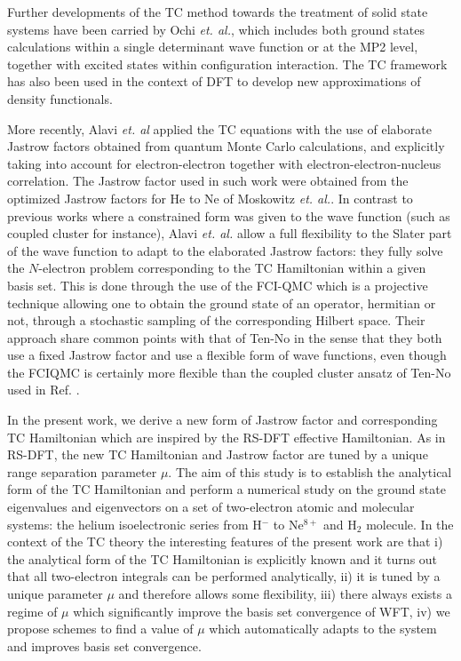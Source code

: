 \documentclass[aip,jcp,reprint,noshowkeys,superscriptaddress]{revtex4-1}
\begin{document}
Further developments of the TC method towards the treatment of solid state systems have been carried by Ochi \textit{et. al.}\cite{OchSodSakTsu-JCP-12,OchTsu-JCTC-14,OchTsu-CPL-15,OchYamAriTsu-JCP-16}, which includes both ground states calculations within a single determinant wave function \cite{OchSodSakTsu-JCP-12,OchYamAriTsu-JCP-16} or at the MP2 level\cite{OchTsu-CPL-15}, together with excited states within configuration interaction\cite{OchTsu-JCTC-14}. 
The TC framework has also been used in the context of DFT to develop new approximations of density functionals\cite{ImaScu-JCP-03,UmeChi-PRA-06,Umezawa-JCP-17}. 

More recently, Alavi \textit{et. al}\cite{CohLuoGutDobTewAla-JCP-19} applied the TC equations with the use of elaborate Jastrow factors obtained from quantum Monte Carlo calculations, and explicitly taking into account for electron-electron together with electron-electron-nucleus correlation. The Jastrow factor used in such work were obtained from the optimized Jastrow factors for He to Ne of Moskowitz \textit{et. al.}\cite{SchMos-JCP-90}. 
In contrast to previous works where a constrained form was given to the wave function (such as coupled cluster for instance\cite{HinTanTen-CPL-02}),  Alavi \textit{et. al.} allow a full flexibility to the Slater part of the wave function to adapt to the elaborated Jastrow factors: they fully solve the $N$-electron problem corresponding to the TC Hamiltonian within a given basis set. 
This is done through the use of the FCI-QMC\cite{BooThoAla-JCP-09,BooAla-JCP-10,BooCleThoAla-JCP-11,GhaLozAla-JCP-19,VitAlaKat-JCTC-20} which is a projective technique allowing one to obtain the ground state of an operator, hermitian or not, through a stochastic sampling of the corresponding Hilbert space. Their approach share common points with that of Ten-No in the sense that they both use a fixed Jastrow factor and use a flexible form of wave functions, 
even though the FCIQMC is certainly more flexible than the coupled cluster ansatz of Ten-No used in Ref. . 

In the present work, we derive a new form of Jastrow factor and corresponding TC Hamiltonian which are inspired by the RS-DFT effective Hamiltonian. As in RS-DFT, the new TC Hamiltonian and Jastrow factor are tuned by a unique range separation parameter $\mu$. The aim of this study is to establish the analytical form of the TC Hamiltonian and perform a numerical study on the ground state eigenvalues and eigenvectors on a set of two-electron atomic and molecular systems: the helium isoelectronic series from H$^-$ to Ne$^{8+}$ and H$_2$ molecule. In the context of the TC theory the interesting features of the present work are that i) the analytical form of the TC Hamiltonian is explicitly known and it turns out that all two-electron integrals can be performed analytically, ii) it is tuned by a unique parameter $\mu$ and therefore allows some flexibility, iii) there always exists a regime of $\mu$ which significantly improve the basis set convergence of WFT, iv) we propose schemes to find a value of $\mu$ which automatically adapts to the system and improves basis set convergence. 
\end{document}
